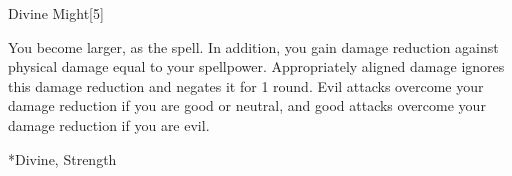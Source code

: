 \begin{spellsection}{Divine Might}[5]
    \begin{spellheader}
    \end{spellheader}
    \begin{spellcontent}
        \begin{spelltargetinginfo}
        \end{spelltargetinginfo}
        \begin{spelleffects}
            \spelleffect You become larger, as the  spell. In addition, you gain damage reduction against physical damage equal to your spellpower. Appropriately aligned damage ignores this damage reduction and negates it for 1 round. Evil attacks overcome your damage reduction if you are good or neutral, and good attacks overcome your damage reduction if you are evil.
            \spelldur \durshort \dismissable
        \end{spelleffects}
    \end{spellcontent}
    \begin{spellfooter}
        *{Divine, Strength}
        \spellnotes \sizingspellnotes
        \miscastexplode
    \end{spellfooter}
\end{spellsection}

